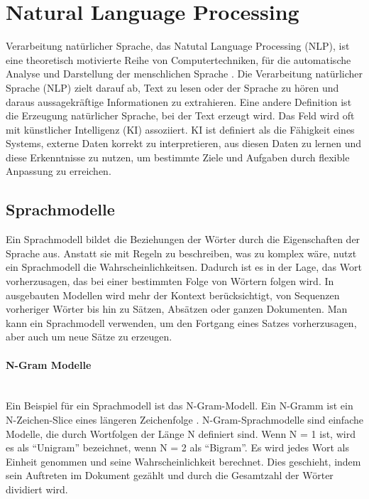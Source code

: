 \documentclass[
        ngerman,
        paper=a4,
        numbers=noendperiod,
]{scrreprt}
\begin{document}
\section{Natural Language Processing}

Verarbeitung natürlicher Sprache, das Natutal Language Processing (NLP), ist eine theoretisch motivierte Reihe von Computertechniken, für die automatische Analyse und Darstellung der menschlichen Sprache \citep[S. 48]{cambria2014jumping}. Die Verarbeitung natürlicher Sprache (NLP) zielt darauf ab, Text zu lesen oder der Sprache zu hören und daraus aussagekräftige Informationen zu extrahieren. Eine andere Definition ist die Erzeugung natürlicher Sprache, bei der Text erzeugt wird. Das Feld wird oft mit künstlicher Intelligenz (KI) assoziiert. KI ist definiert als die Fähigkeit eines Systems, externe Daten korrekt zu interpretieren, aus diesen Daten zu lernen und diese Erkenntnisse zu nutzen, um bestimmte Ziele und Aufgaben durch flexible Anpassung zu erreichen.

\subsection{Sprachmodelle}
Ein Sprachmodell \citep{goodman2001bit} bildet die Beziehungen der Wörter durch die Eigenschaften der Sprache aus. Anstatt sie mit Regeln zu beschreiben, was zu komplex wäre, nutzt ein Sprachmodell die Wahrscheinlichkeitsen. Dadurch ist es in der Lage, das Wort vorherzusagen, das bei einer bestimmten Folge von Wörtern folgen wird. In ausgebauten Modellen wird mehr der Kontext berücksichtigt, von Sequenzen vorheriger Wörter bis hin zu Sätzen, Absätzen oder ganzen Dokumenten. Man kann ein Sprachmodell verwenden, um den Fortgang eines Satzes vorherzusagen, aber auch um neue Sätze zu erzeugen.

\paragraph{N-Gram Modelle}$\;$\\
Ein Beispiel für ein Sprachmodell ist das N-Gram-Modell. Ein N-Gramm ist ein N-Zeichen-Slice eines längeren Zeichenfolge \citep{cavnar1994n}. N-Gram-Sprachmodelle sind einfache Modelle, die durch Wortfolgen der Länge N definiert sind. Wenn N = 1 ist, wird es als \enquote{Unigram} bezeichnet, wenn N = 2 als \enquote{Bigram}. Es wird jedes Wort als Einheit genommen und seine Wahrscheinlichkeit berechnet. Dies geschieht, indem sein Auftreten im Dokument gezählt und durch die Gesamtzahl der Wörter dividiert wird. 
\end{document}
